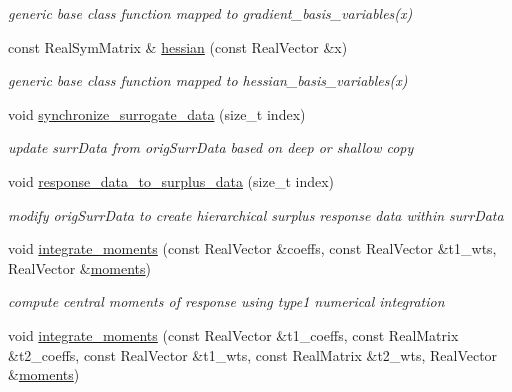 \begin{DoxyCompactItemize}
\begin{DoxyCompactList}\small\item\em generic base class function mapped to gradient\+\_\+basis\+\_\+variables(x) \end{DoxyCompactList}\item 
const Real\+Sym\+Matrix \& \hyperlink{classPecos_1_1PolynomialApproximation_ad0b8d39aa7ec7b96b8753ac84e806d42}{hessian} (const Real\+Vector \&x)\label{classPecos_1_1PolynomialApproximation_ad0b8d39aa7ec7b96b8753ac84e806d42}

\begin{DoxyCompactList}\small\item\em generic base class function mapped to hessian\+\_\+basis\+\_\+variables(x) \end{DoxyCompactList}\item 
void \hyperlink{classPecos_1_1PolynomialApproximation_a7a80972ae3e63c06ce3a3c0a23a493eb}{synchronize\+\_\+surrogate\+\_\+data} (size\+\_\+t index)\label{classPecos_1_1PolynomialApproximation_a7a80972ae3e63c06ce3a3c0a23a493eb}

\begin{DoxyCompactList}\small\item\em update surr\+Data from orig\+Surr\+Data based on deep or shallow copy \end{DoxyCompactList}\item 
void \hyperlink{classPecos_1_1PolynomialApproximation_a1018349fe99125fb141db359fe63b72c}{response\+\_\+data\+\_\+to\+\_\+surplus\+\_\+data} (size\+\_\+t index)\label{classPecos_1_1PolynomialApproximation_a1018349fe99125fb141db359fe63b72c}

\begin{DoxyCompactList}\small\item\em modify orig\+Surr\+Data to create hierarchical surplus response data within surr\+Data \end{DoxyCompactList}\item 
void \hyperlink{classPecos_1_1PolynomialApproximation_a4596913d9bcd687dffaa5c1138c2b400}{integrate\+\_\+moments} (const Real\+Vector \&coeffs, const Real\+Vector \&t1\+\_\+wts, Real\+Vector \&\hyperlink{classPecos_1_1PolynomialApproximation_a05509beee5c681b6a6af6344c54ef85c}{moments})\label{classPecos_1_1PolynomialApproximation_a4596913d9bcd687dffaa5c1138c2b400}

\begin{DoxyCompactList}\small\item\em compute central moments of response using type1 numerical integration \end{DoxyCompactList}\item 
void \hyperlink{classPecos_1_1PolynomialApproximation_a84661c4aa789a38de9e83ae350abebb4}{integrate\+\_\+moments} (const Real\+Vector \&t1\+\_\+coeffs, const Real\+Matrix \&t2\+\_\+coeffs, const Real\+Vector \&t1\+\_\+wts, const Real\+Matrix \&t2\+\_\+wts, Real\+Vector \&\hyperlink{classPecos_1_1PolynomialApproximation_a05509beee5c681b6a6af6344c54ef85c}{moments})\label{classPecos_1_1PolynomialApproximation_a84661c4aa789a38de9e83ae350abebb4}


\end{DoxyCompactItemize}
